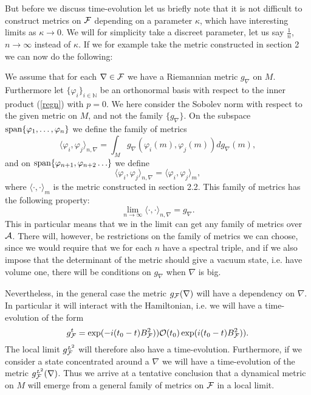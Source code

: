 \documentclass[letterpaper,12pt]{article}
\def\ca{{\cal A}}
\def\cf{{\cal F}}
\def\co{{\cal O}}
\begin{document}
But before we discuss time-evolution let us briefly note that it is not difficult to construct metrics on $\cf$ depending on a parameter $\kappa$, which have interesting limits as $\kappa \to 0$. We will for simplicity take a discreet parameter, let us say $\frac{1}{n}$, $n\to \infty$ instead of $\kappa$. If we for example take the metric constructed in section 2 we can now do the following:  

We assume that for each $\nabla  \in \cf$ we have a Riemannian metric $g_\nabla$ on $M$. Furthermore let    $\{\varphi_i \}_{i\in \mathbb{N}}$ be an orthonormal basis with respect to the inner product (\ref{regn}) with $p=0$. We here consider the Sobolev norm with respect to the given metric on $M$, and not the family  $\{ g_\nabla \}$. On the subspace $\hbox{span}\{\varphi_1,\ldots , \varphi_n \}$ we define the family of metrics
$$\langle  \varphi_i, \varphi_j \rangle_{n,\nabla} =\int_M g_\nabla (\varphi_i (m) , \varphi_j(m))dg_\nabla (m)  ,$$
and on $\hbox{span}\{\varphi_{n+1},\varphi_{n+2}\ldots  \}$ we define 
$$ \langle  \varphi_i, \varphi_j \rangle_{n,\nabla} = \langle \varphi_i,  \varphi_j \rangle_m  , $$
where $\langle \cdot , \cdot \rangle_{m}$ is the metric constructed in section 2.2. 
This family of metrics has the following property: 
$$\lim_{n\to \infty} \langle \cdot , \cdot \rangle_{n,\nabla} =g_\nabla .$$
This in particular means that we in the limit can get any family of metrics over $\ca$. There will, however, be restrictions on the family of metrics we can choose, since we would require that we for each $n$ have a spectral triple, and if we also impose that the determinant of the metric should give a vacuum state, i.e. have volume one, there will be conditions on $g_\nabla$ when $\nabla$ is big. 


Nevertheless, in the general case the metric $ g_{\cf}(\nabla)  $ will have a dependency on $\nabla$.  In particular it will interact with the Hamiltonian, i.e. we will have a time-evolution of the form 
\begin{equation} g_{\cf}^t = \exp(- i(t_0 - t) B^2_\cf )) 
\co(t_0)
\exp( i(t_0 - t) B^2_\cf )).
\label{time}
\end{equation}
The local limit $g_{\cf}^{\mbox{\tiny$L^2$}}$ will therefore also have a time-evolution. Furthermore, if we consider a state concentrated around a $\nabla$ we will have a time-evolution of the metric   $g_{\cf}^{\mbox{\tiny$L^2$}}(\nabla)$. Thus we arrive at a tentative conclusion that a dynamical metric on $M$ will emerge from a general family of metrics on $\cf$ in a  local limit.
\end{document}
